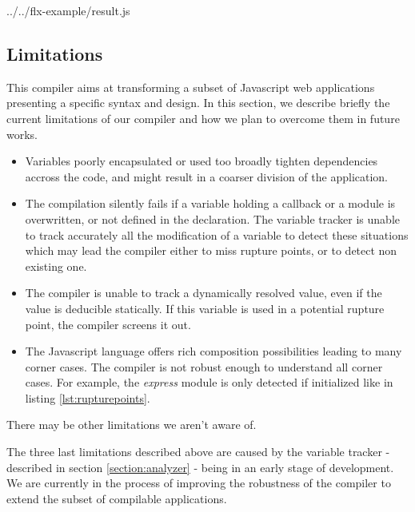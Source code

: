 {../../flx-example/result.js}

\subsection{Limitations}

This compiler aims at transforming a subset of Javascript web applications presenting a specific syntax and design.
In this section, we describe briefly the current limitations of our compiler and how we plan to overcome them in future works.

\begin{itemize}
  \item Variables poorly encapsulated or used too broadly tighten dependencies accross the code, and might result in a coarser division of the application.
  \item The compilation silently fails if a variable holding a callback or a module is overwritten, or not defined in the declaration.
        The variable tracker is unable to track accurately all the modification of a variable to detect these situations which may lead the compiler either to miss rupture points, or to detect non existing one.
  \item The compiler is unable to track a dynamically resolved value, even if the value is deducible statically.
        If this variable is used in a potential rupture point, the compiler screens it out.
  \item The Javascript language offers rich composition possibilities leading to many corner cases.
        The compiler is not robust enough to understand all corner cases.
        For example, the \textit{express} module is only detected if initialized like in listing \ref{lst:rupturepoints}.
\end{itemize}
There may be other limitations we aren't aware of.

The three last limitations described above are caused by the variable tracker - described in section \ref{section:analyzer} - being in an early stage of development.
We are currently in the process of improving the robustness of the compiler to extend the subset of compilable applications.

